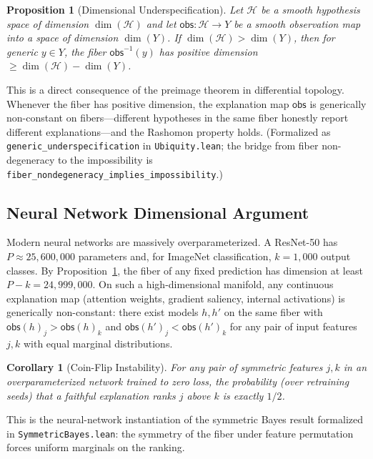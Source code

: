 \documentclass{article}
\newtheorem{corollary}{Corollary}
\newtheorem{proposition}{Proposition}
\newcommand{\sH}{\mathcal{H}}
\begin{document}
\begin{proposition}[Dimensional Underspecification]
\label{prop:generic-underspec}
Let $\sH$ be a smooth hypothesis space of dimension $\dim(\sH)$ and let
$\mathsf{obs} : \sH \to Y$ be a smooth observation map into a space of
dimension $\dim(Y)$.  If $\dim(\sH) > \dim(Y)$, then for generic
$y \in Y$, the fiber $\mathsf{obs}^{-1}(y)$ has positive dimension
$\geq \dim(\sH) - \dim(Y)$.
\end{proposition}

\noindent
This is a direct consequence of the preimage theorem in differential
topology.  Whenever the fiber has positive dimension, the explanation map
$\mathsf{obs}$ is generically non-constant on fibers---different hypotheses
in the same fiber honestly report different explanations---and the Rashomon
property holds.  (Formalized as \texttt{generic\_underspecification} in
\texttt{Ubiquity.lean}; the bridge from fiber non-degeneracy to the
impossibility is \texttt{fiber\_nondegeneracy\_implies\_impossibility}.)

\subsection{Neural Network Dimensional Argument}
\label{sec:nn-dimensional}

Modern neural networks are massively overparameterized.  A ResNet-50 has
$P \approx 25{,}600{,}000$ parameters and, for ImageNet classification,
$k = 1{,}000$ output classes.  By Proposition~\ref{prop:generic-underspec},
the fiber of any fixed prediction has dimension at least
$P - k = 24{,}999{,}000$.  On such a high-dimensional manifold, any
continuous explanation map (attention weights, gradient saliency, internal
activations) is generically non-constant: there exist models $h, h'$ on the
same fiber with $\mathsf{obs}(h)_j > \mathsf{obs}(h)_k$ and
$\mathsf{obs}(h')_j < \mathsf{obs}(h')_k$ for any pair of input features
$j, k$ with equal marginal distributions.

\begin{corollary}[Coin-Flip Instability]
\label{cor:coin-flip}
For any pair of symmetric features $j, k$ in an overparameterized network
trained to zero loss, the probability (over retraining seeds) that a
faithful explanation ranks $j$ above $k$ is exactly $1/2$.
\end{corollary}

\noindent
This is the neural-network instantiation of the symmetric Bayes result
formalized in \texttt{SymmetricBayes.lean}: the symmetry of the fiber
under feature permutation forces uniform marginals on the ranking.
\end{document}
